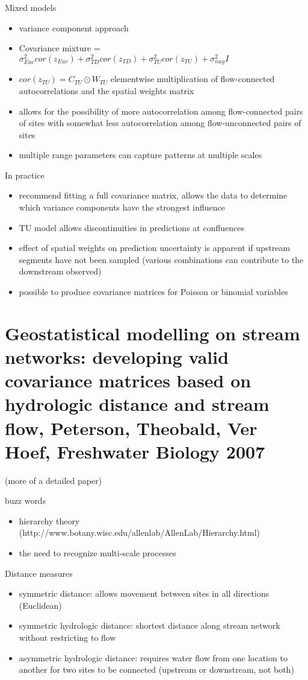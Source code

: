 \documentclass[12pt]{amsart}
\begin{document}
Mixed models
\begin{itemize}
\item variance component approach
\item Covariance mixture = $\sigma^2_{Euc}cor(z_{Euc})+\sigma^2_{TD}cor(z_{TD})+\sigma^2_{TU}cor(z_{TU})+\sigma^2_{nug}I$
\item $cor(z_{TU})= C_{TU} \odot W_{TU}$ elementwise multiplication of flow-connected autocorrelations and the spatial weights matrix 
\item allows for the possibility of more autocorrelation among flow-connected pairs of sites with somewhat less autocorrelation among flow-unconnected pairs of sites
\item multiple range parameters can capture patterns at multiple scales
\end{itemize}

In practice
\begin{itemize}
\item recommend fitting a full covariance matrix, allows the data to determine which variance components have the strongest influence
\item TU model allows discontinuities in predictions at confluences
\item effect of spatial weights on prediction uncertainty is apparent if upstream segments have not been sampled (various combinations can contribute to the downstream observed)
\item possible to produce covariance matrices for Poisson or binomial variables
\end{itemize}

\section{Geostatistical modelling on stream networks: developing
valid covariance matrices based on hydrologic distance
and stream flow, Peterson, Theobald, Ver Hoef, Freshwater Biology 2007}

(more of a detailed paper)

buzz words
\begin{itemize}
\item hierarchy theory (http://www.botany.wisc.edu/allenlab/AllenLab/Hierarchy.html)
\item the need to recognize multi-scale processes
\end{itemize}

Distance measures
\begin{itemize}
\item symmetric distance: allows movement between sites in all directions (Euclidean)
\item symmetric hydrologic distance: shortest distance along stream network without restricting to flow
\item asymmetric hydrologic distance: requires water flow from one location to another for two sites to be connected (upstream or downstream, not both)
\end{itemize}
\end{document}
